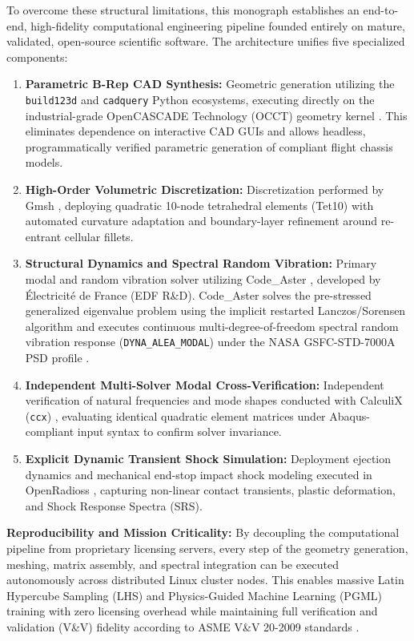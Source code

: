 To overcome these structural limitations, this monograph establishes an end-to-end, high-fidelity computational engineering pipeline founded entirely on mature, validated, open-source scientific software. The architecture unifies five specialized components:
\begin{enumerate}
\item \textbf{Parametric B-Rep CAD Synthesis:} Geometric generation utilizing the \texttt{build123d} and \texttt{cadquery} Python ecosystems, executing directly on the industrial-grade OpenCASCADE Technology (OCCT) geometry kernel \cite{calpoly2022}. This eliminates dependence on interactive CAD GUIs and allows headless, programmatically verified parametric generation of compliant flight chassis models.
\item \textbf{High-Order Volumetric Discretization:} Discretization performed by Gmsh \cite{geuzaine2009}, deploying quadratic 10-node tetrahedral elements (Tet10) with automated curvature adaptation and boundary-layer refinement around re-entrant cellular fillets.
\item \textbf{Structural Dynamics and Spectral Random Vibration:} Primary modal and random vibration solver utilizing Code\_Aster \cite{codeaster2024}, developed by Électricité de France (EDF R\&D). Code\_Aster solves the pre-stressed generalized eigenvalue problem using the implicit restarted Lanczos/Sorensen algorithm \cite{sorensen1992,lanczos1950} and executes continuous multi-degree-of-freedom spectral random vibration response (\texttt{DYNA\_ALEA\_MODAL}) under the NASA GSFC-STD-7000A PSD profile \cite{nasa2013}.
\item \textbf{Independent Multi-Solver Modal Cross-Verification:} Independent verification of natural frequencies and mode shapes conducted with CalculiX (\texttt{ccx}) \cite{dhondt2004}, evaluating identical quadratic element matrices under Abaqus-compliant input syntax to confirm solver invariance.
\item \textbf{Explicit Dynamic Transient Shock Simulation:} Deployment ejection dynamics and mechanical end-stop impact shock modeling executed in OpenRadioss \cite{openradioss2023}, capturing non-linear contact transients, plastic deformation, and Shock Response Spectra (SRS).
\end{enumerate}

\begin{svgraybox}
\textbf{Reproducibility and Mission Criticality:}
By decoupling the computational pipeline from proprietary licensing servers, every step of the geometry generation, meshing, matrix assembly, and spectral integration can be executed autonomously across distributed Linux cluster nodes. This enables massive Latin Hypercube Sampling (LHS) and Physics-Guided Machine Learning (PGML) training with zero licensing overhead while maintaining full verification and validation (V\&V) fidelity according to ASME V\&V 20-2009 standards \cite{asme2009}.
\end{svgraybox}

